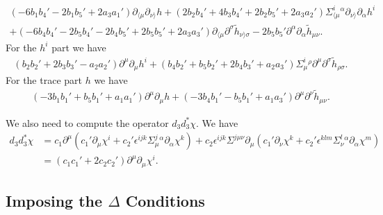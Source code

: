 \documentclass[10pt]{report}
\theoremstyle{definition}
\begin{document}
 \begin{align}
 ( -6 b_1 b_4'  - 2 b_1b_5' + 2a_3 a_1' ) \partial_{\langle\mu} \partial_{\nu\rangle} h  + (2b_2 b_4' + 4b_3 b_4' +  2b_2 b_5' + 2a_3 a_2' ) \Sigma^i_{\langle\mu}{}^\alpha \partial_{\nu\rangle} \partial_\alpha h^i \\ \nonumber
  +(-6 b_4 b_4'  - 2b_5 b_4' -  2b_4 b_5'+  2 b_5 b_5'+ 2 a_3 a_3' ) \partial_{\langle\mu} \partial^\sigma \tilde{h}_{\nu\rangle\sigma} 
  -  2 b_5 b_5'  \partial^\alpha \partial_\alpha \tilde{h}_{\mu\nu}.
  \end{align}
  For the $h^i$ part we have
  \begin{align}
     (b_2  b_2' + 2 b_3 b_3'  - a_2 a_2' )\partial^\mu \partial_\mu h^i+  (b_4 b_2' +  b_5 b_2' + 2b_4 b_3' + a_2 a_3'  ) \Sigma^i_\mu{}^\rho \partial^\mu \partial^\sigma \tilde{h}_{\rho\sigma}.
    \end{align}
For the trace part $h$ we have 
    \begin{align}
     ( - 3 b_1 b_1' + b_5 b_1' + a_1 a_1' ) \partial^\mu \partial_\mu h + (-3 b_4 b_1'  - b_5 b_1' + a_1 a_3' )\partial^\mu \partial^\nu \tilde{h}_{\mu\nu}.  
      \end{align}
      
  We also need to compute the operator $d_3 d_3^* \chi$. We have
  \begin{align}
  d_3 d_3^* \chi & = c_1 \partial^\mu (c_1' \partial_\mu \chi^i + c_2' \epsilon^{ijk} \Sigma^j_\mu{}^\alpha \partial_\alpha \chi^k) 
  + c_2 \epsilon^{ijk} \Sigma^{j\mu\nu} \partial_\mu (c_1' \partial_\nu \chi^k + c_2' \epsilon^{klm} \Sigma^l_\nu{}^\alpha \partial_\alpha \chi^m) \\ & =  \nonumber
 ( c_1 c_1' + 2 c_2 c_2')\partial^\mu \partial_\mu \chi^i.
  \end{align}
      
\subsection{Imposing the \texorpdfstring{$\Delta$}{} Conditions}
      
\end{document}

